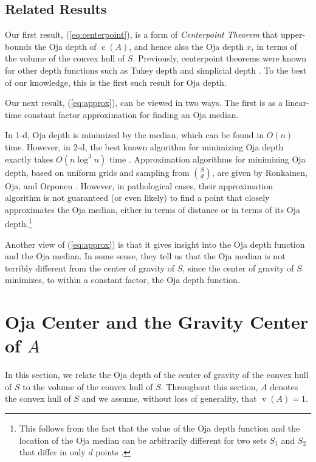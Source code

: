 \documentclass{cccg10}
\DeclareMathOperator{\vol}{v}
\DeclareMathOperator{\cog}{c}
\renewcommand{\eqref}[1]{(\ref{eq:#1})}
\begin{document}
\subsection{Related Results}

Our first result, \eqref{centerpoint}, is a form of \emph{Centerpoint
Theorem} that upper-bounds the Oja depth of $\cog(A)$, and hence
also the Oja depth $x$, in terms of the volume of the convex hull
of $S$.  Previously, centerpoint theorems were known for other depth
functions such as Tukey depth \cite{m02,pa95,t71} and simplicial depth
\cite{b82,bf84,l90}.  To the best of our knowledge, this is the first
such result for Oja depth.

Our next result, \eqref{approx}, can be viewed in two
ways.  The first is as a linear-time constant factor approximation for
finding an Oja median. 

In 1-d, Oja depth is minimized by the median, which can be found in $O(n)$
time. However, in 2-d, the best known algorithm for minimizing Oja depth
exactly takes $O(n\log^3 n)$ time \cite{alst03}.  Approximation algorithms
for minimizing Oja depth, based on uniform grids and sampling from
$\binom{S}{d}$, are given by Ronkainen, Oja, and Orponen \cite{roo01}.
However, in pathological cases, their approximation algorithm is not
guaranteed (or even likely) to find a point that closely approximates
the Oja median, either in terms of distance or in terms of its Oja
depth.\footnote{This follows from the fact that the value of the Oja depth
function and the location of the Oja median can be arbitrarily different
for two sets $S_1$ and $S_2$ that differ in only $d$ points \cite{not90}.}

Another view of \eqref{approx} is that it gives insight into
the Oja depth function and the Oja median.  In some sense, they tell us
that the Oja median is not terribly different from the center of gravity
of $S$, since the center of gravity of $S$ minimizes, to within a constant factor, the Oja depth function.

\section{Oja Center and the Gravity Center of $A$}
\label{sec:gravcenter}

In this section, we relate the Oja depth of the center of gravity of the
convex hull of $S$ to the volume of the convex hull of $S$.  Throughout
this section, $A$ denotes the convex hull of $S$ and we assume, without
loss of generality, that $\vol(A)=1$.
\end{document}
